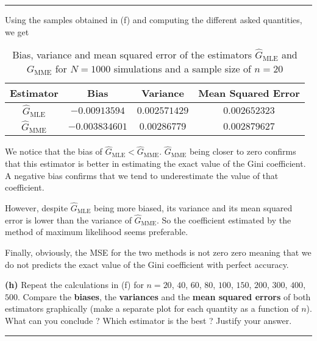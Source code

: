 \begin{center}\rule{6cm}{0.4pt}\end{center}

Using the samples obtained in (f) and computing the different asked quantities, we get

\begin{table}[H]
  \centering
  \begin{tabular}{cccc} \toprule
    Estimator                      & Bias                     & Variance               & Mean Squared Error \\\hline
    $\hat{G}_{\text{MLE}}$         & $-0.00913594$            & $0.002571429$          & $0.002652323$ \\
    $\hat{G}_{\text{MME}}$         & $-0.003834601$           & $0.00286779$           & $0.002879627$ \\\hline       
  \end{tabular}
  \caption{Bias, variance and mean squared error of the estimators $\hat{G}_{\text{MLE}}$ and $\hat{G}_{\text{MME}}$ for $N = 1000$ simulations and a sample size of $n = 20$}
  \label{tab:gini_estimator_statistical_quantities}
\end{table}

We notice that the bias of $\hat{G}_{\text{MLE}} < \hat{G}_{\text{MME}}$. $\hat{G}_{\text{MME}}$ being closer to zero confirms that this estimator is better in estimating the exact value of the Gini coefficient. A negative bias confirms that we tend to underestimate the value of that coefficient. 

However, despite $\hat{G}_{\text{MLE}}$ being more biased, its variance and its mean squared error is lower than the variance of $\hat{G}_{\text{MME}}$. So the coefficient estimated by the method of maximum likelihood seems preferable. 

Finally, obviously, the MSE for the two methods is not zero zero meaning that we do not predicts the exact value of the Gini coefficient with perfect accuracy. 

\textbf{(h)} Repeat the calculations in (f) for $n = 20$, $40$, $60$, $80$, $100$, $150$, $200$, $300$, $400$, $500$. Compare the \textbf{biases}, the \textbf{variances} and the \textbf{mean squared errors} of both estimators graphically (make a separate plot for each quantity as a function of $n$). What can you conclude ? Which estimator is the best ? Justify your answer.

\begin{center}\rule{6cm}{0.4pt}\end{center}

